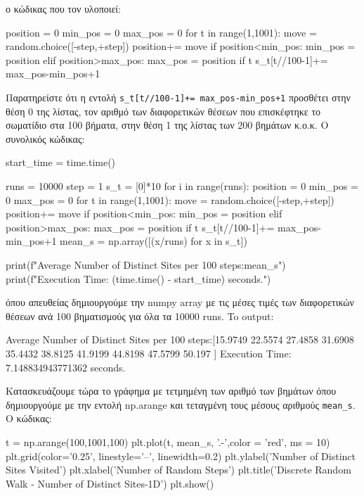 \gr
ο κώδικας που τον υλοποιεί:
\en
\begin{python}
position = 0
min_pos = 0
max_pos = 0
for t in range(1,1001):
    move = random.choice([-step,+step])
    position+= move
    if position<min_pos:
        min_pos = position
    elif position>max_pos:
        max_pos = position
    if t%
        s_t[t//100-1]+= max_pos-min_pos+1
\end{python}
\gr 
Παρατηρείστε ότι η εντολή {\en \texttt{s\_t[t//100-1]+= max\_pos-min\_pos+1}} προσθέτει στην θέση 0 της λίστας, τον αριθμό των διαφορετικών θέσεων που επισκέφτηκε το σωματίδιο στα 100 βήματα, στην θέση 1 της λίστας των 200 βημάτων κ.ο.κ.
\newpage
\noindent
Ο συνολικός κώδικας:
\en
\begin{python}
start_time = time.time()

runs = 10000
step = 1
s_t = [0]*10
for i in range(runs):
    position = 0
    min_pos = 0
    max_pos = 0
    for t in range(1,1001):
        move = random.choice([-step,+step])
        position+= move
        if position<min_pos:
            min_pos = position
        elif position>max_pos:
            max_pos = position
        if t%
            s_t[t//100-1]+= max_pos-min_pos+1
mean_s = np.array([(x/runs) for x in s_t])

print(f"Average Number of Distinct Sites per 100 steps:{mean_s}")
print(f"Execution Time: {(time.time() - start_time)} seconds.")
\end{python}
\gr όπου απευθείας δημιουργούμε την {\en numpy array} με τις μέσες τιμές των διαφορετικών θέσεων ανά 100 βηματισμούς για όλα τα 10000 {\en runs}.
To {\en output}:
\en
\begin{python}
Average Number of Distinct Sites per 100 steps:[15.9749 
                                                22.5574 
                                                27.4858 
                                                31.6908 
                                                35.4432 
                                                38.8125 
                                                41.9199 
                                                44.8198 
                                                47.5799
                                                50.197 ]
Execution Time: 7.148834943771362 seconds.
\end{python}
\gr 
Κατασκευάζουμε τώρα το γράφημα με τετμημένη των αριθμό των βημάτων όπου δημιουργούμε με την εντολή {\en np.arange} και τεταγμένη τους μέσους αριθμούς {\en \texttt{mean\_s}}. 
\newpage
\noindent
Ο κώδικας: 
\en 
\begin{python}
t = np.arange(100,1001,100)
plt.plot(t, mean_s, '.-',color = 'red', ms = 10)
plt.grid(color='0.25', linestyle='--', linewidth=0.2)
plt.ylabel('Number of Distinct Sites Visited')
plt.xlabel('Number of Random Steps')
plt.title('Discrete Random Walk - Number of Distinct Sites-1D')
plt.show()
\end{python}
